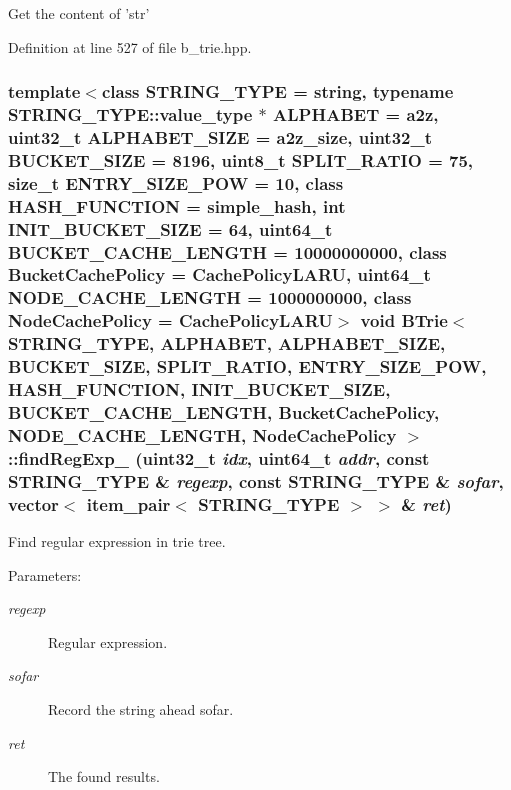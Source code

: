 Get the content of 'str' 

Definition at line 527 of file b\_\-trie.hpp.\hypertarget{classBTrie_3125cac8b6ba87306a3636bddd0da0f3}{
\subsubsection[{findRegExp\_\-}]{\setlength{\rightskip}{0pt plus 5cm}template$<$class STRING\_\-TYPE  = string, typename STRING\_\-TYPE::value\_\-type $\ast$ ALPHABET = a2z, uint32\_\-t ALPHABET\_\-SIZE = a2z\_\-size, uint32\_\-t BUCKET\_\-SIZE = 8196, uint8\_\-t SPLIT\_\-RATIO = 75, size\_\-t ENTRY\_\-SIZE\_\-POW = 10, class HASH\_\-FUNCTION  = simple\_\-hash, int INIT\_\-BUCKET\_\-SIZE = 64, uint64\_\-t BUCKET\_\-CACHE\_\-LENGTH = 10000000000, class BucketCachePolicy  = CachePolicyLARU, uint64\_\-t NODE\_\-CACHE\_\-LENGTH = 1000000000, class NodeCachePolicy  = CachePolicyLARU$>$ void {\bf BTrie}$<$ STRING\_\-TYPE, ALPHABET, ALPHABET\_\-SIZE, BUCKET\_\-SIZE, SPLIT\_\-RATIO, ENTRY\_\-SIZE\_\-POW, HASH\_\-FUNCTION, INIT\_\-BUCKET\_\-SIZE, BUCKET\_\-CACHE\_\-LENGTH, BucketCachePolicy, NODE\_\-CACHE\_\-LENGTH, NodeCachePolicy $>$::findRegExp\_\- (uint32\_\-t {\em idx}, \/  uint64\_\-t {\em addr}, \/  const STRING\_\-TYPE \& {\em regexp}, \/  const STRING\_\-TYPE \& {\em sofar}, \/  vector$<$ item\_\-pair$<$ STRING\_\-TYPE $>$ $>$ \& {\em ret})}}
\label{classBTrie_3125cac8b6ba87306a3636bddd0da0f3}


Find regular expression in trie tree. \begin{Desc}
\item[Parameters:]
\begin{description}
\item[{\em regexp}]Regular expression. \item[{\em sofar}]Record the string ahead sofar. \item[{\em ret}]The found results. \end{description}
\end{Desc}



